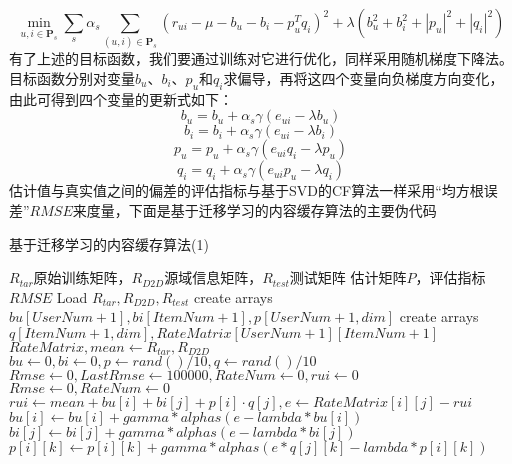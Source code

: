 \documentclass[bachelor]{seuthesis} %
\begin{document}
\begin{Main}
\begin{equation}
\min_{u,i\in\textbf{P}_s}\sum_s\alpha_s\sum_{(u,i)\in\textbf{P}_s}(r_{ui}-\mu-b_u-b_i-p_u^Tq_i)^2+\lambda(b_u^2+b_i^2+|p_u|^2+|q_i|^2)
\end{equation}
有了上述的目标函数，我们要通过训练对它进行优化，同样采用随机梯度下降法。目标函数分别对变量$b_u$、$b_i$、$p_u$和$q_i$求偏导，再将这四个变量向负梯度方向变化，由此可得到四个变量的更新式如下：
\begin{equation}
b_u=b_u+\alpha_s\gamma(e_{ui}-\lambda b_u)
\end{equation}
\begin{equation}
b_i=b_i+\alpha_s\gamma(e_{ui}-\lambda b_i)
\end{equation}
\begin{equation}
p_u=p_u+\alpha_s\gamma(e_{ui}q_i-\lambda p_u)
\end{equation}
\begin{equation}
q_i=q_i+\alpha_s\gamma(e_{ui}p_u-\lambda q_i)
\end{equation}
估计值与真实值之间的偏差的评估指标与基于SVD的CF算法一样采用“均方根误差”$RMSE$来度量，下面是基于迁移学习的内容缓存算法的主要伪代码
\begin{algorithm}
    \caption{基于迁移学习的内容缓存算法(1)}
    \begin{algorithmic}[1] %
        \Require $R_{tar}$原始训练矩阵，$R_{D2D}$源域信息矩阵，$R_{test}$测试矩阵
        \Ensure 估计矩阵$P$，评估指标$RMSE$
            \State Load $R_{tar},R_{D2D},R_{test}$
            \State create arrays $bu[UserNum+1],bi[ItemNum+1],p[UserNum+1,dim]$
            \State create arrays $q[ItemNum+1,dim],RateMatrix[UserNum+1][ItemNum+1]$
            \State $RateMatrix,mean \gets R_{tar},R_{D2D}$
                \State $bu\gets0,bi\gets0,p\gets rand()/10,q\gets rand()/10$
            \EndFor
        \EndFunction
        \State $Rmse\gets0,LastRmse\gets100000,RateNum\gets0,rui\gets0$
            \State $Rmse\gets0,RateNum\gets0$
                    \State $rui\gets mean+bu[i]+bi[j]+p[i]\cdot q[j],e\gets RateMatrix[i][j]-rui$
                    \State $bu[i]\gets bu[i]+gamma*alphas(e-lambda*bu[i])$
                    \State $bi[j]\gets bi[j]+gamma*alphas(e-lambda*bi[j])$
                        \State $p[i][k]\gets p[i][k]+gamma*alphas(e*q[j][k]-lambda*p[i][k])$

\end{algorithmic}
\end{algorithm}
\end{Main}
\end{document}
